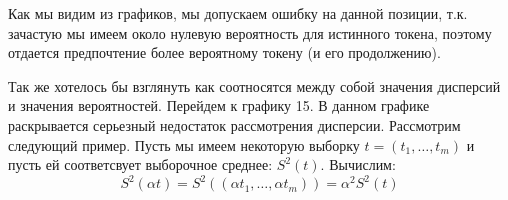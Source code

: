 \documentclass[a4paper,14pt]{extarticle}
\begin{document}
	\begin{figure}[t]
	\end{figure}
	
	Как мы видим из графиков, мы допускаем ошибку на данной позиции, т.к. зачастую мы имеем около нулевую вероятность для истинного токена, поэтому отдается предпочтение более вероятному токену (и его продолжению).
	
	\begin{figure}[t]
	\end{figure}
	Так же хотелось бы взглянуть как соотносятся между собой значения дисперсий и значения вероятностей. Перейдем к графику 15. В данном графике раскрывается серьезный недостаток рассмотрения дисперсии. Рассмотрим следующий пример. Пусть мы имеем некоторую выборку $t = (t_1, \dots, t_m)$ и пусть ей соответсвует выборочное среднее: $S^2(t)$. Вычислим:
	\begin{equation*}
		S^2(\alpha t) = S^2((\alpha t_1, \dots, \alpha t_m)) = \alpha^2 S^2(t)
	\end{equation*}
	
\end{document}
